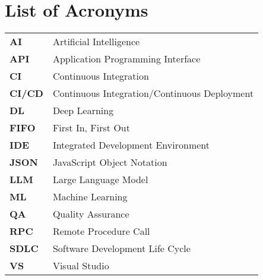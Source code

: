 \chapter*{List of Acronyms}

\begin{spacing}{1.5}

\begin{table}[H]
\centering
\begin{tabular}{p{3cm}p{12cm}}
\textbf{AI} & Artificial Intelligence \\
\textbf{API} & Application Programming Interface \\
\textbf{CI} & Continuous Integration \\
\textbf{CI/CD} & Continuous Integration/Continuous Deployment \\
\textbf{DL} & Deep Learning \\
\textbf{FIFO} & First In, First Out \\
\textbf{IDE} & Integrated Development Environment \\
\textbf{JSON} & JavaScript Object Notation \\
\textbf{LLM} & Large Language Model \\
\textbf{ML} & Machine Learning \\
\textbf{QA} & Quality Assurance \\
\textbf{RPC} & Remote Procedure Call \\
\textbf{SDLC} & Software Development Life Cycle \\
\textbf{VS} & Visual Studio \\
\end{tabular}
\end{table}

\end{spacing}

